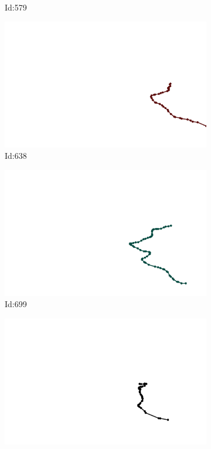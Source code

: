 \documentclass[12pt,twoside]{report}
\begin{document}
\begin{figure}
\begin{subfigure}[b]{0.20\textwidth}
\caption{Id:579}
\end{subfigure}
\begin{subfigure}[b]{0.20\textwidth}
\centering
\includegraphics[width=\textwidth]{../../trajectories/638.png}
\caption{Id:638}
\end{subfigure}
\begin{subfigure}[b]{0.20\textwidth}
\centering
\includegraphics[width=\textwidth]{../../trajectories/699.png}
\caption{Id:699}
\end{subfigure}
\begin{subfigure}[b]{0.20\textwidth}
\centering
\includegraphics[width=\textwidth]{../../trajectories/745.png}

\end{subfigure}
\end{figure}
\end{document}
